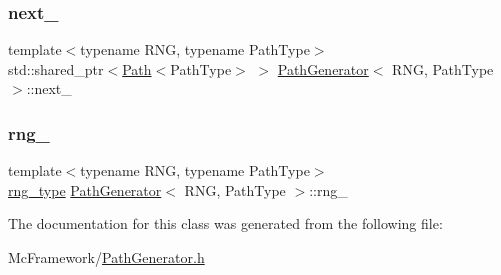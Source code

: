 \hypertarget{class_path_generator_a2a085e303b74fbc34f12161eed56c331}{}\label{class_path_generator_a2a085e303b74fbc34f12161eed56c331} 
\subsubsection{\texorpdfstring{next\+\_\+}{next\_}}
{\footnotesize\ttfamily template$<$typename R\+NG, typename Path\+Type$>$ \\
std\+::shared\+\_\+ptr$<$\hyperlink{class_path}{Path}$<$Path\+Type$>$ $>$ \hyperlink{class_path_generator}{Path\+Generator}$<$ R\+NG, Path\+Type $>$\+::next\+\_\+\hspace{0.3cm}{\ttfamily [private]}}

\hypertarget{class_path_generator_a9a6ba7393db535890497b21b46bdfe67}{}\label{class_path_generator_a9a6ba7393db535890497b21b46bdfe67} 
\subsubsection{\texorpdfstring{rng\+\_\+}{rng\_}}
{\footnotesize\ttfamily template$<$typename R\+NG, typename Path\+Type$>$ \\
\hyperlink{class_path_generator_a7e71cbb5376b07b319b1f042a1035335}{rng\+\_\+type} \hyperlink{class_path_generator}{Path\+Generator}$<$ R\+NG, Path\+Type $>$\+::rng\+\_\+\hspace{0.3cm}{\ttfamily [private]}}



The documentation for this class was generated from the following file\+:\begin{DoxyCompactItemize}
\item 
Mc\+Framework/\hyperlink{_path_generator_8h}{Path\+Generator.\+h}\end{DoxyCompactItemize}
